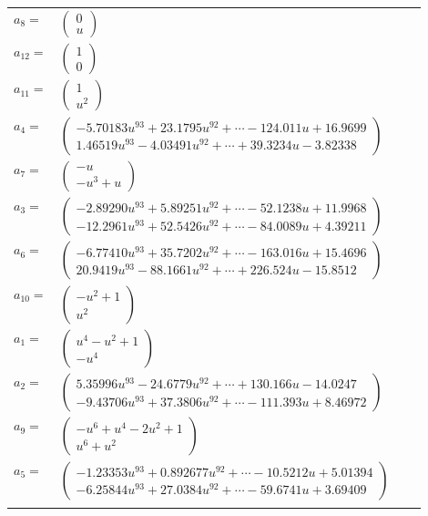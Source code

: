 \documentclass[1p]{elsarticle_modified}
\theoremstyle{definition}
\begin{document}
\begin{tabular}{m{7pt} m{180pt} m{7pt} m{180pt} }
\flushright $a_{8}=$&$\begin{pmatrix}0\\u\end{pmatrix}$ \\
\flushright $a_{12}=$&$\begin{pmatrix}1\\0\end{pmatrix}$ \\
\flushright $a_{11}=$&$\begin{pmatrix}1\\u^2\end{pmatrix}$ \\
\flushright $a_{4}=$&$\begin{pmatrix}-5.70183 u^{93}+23.1795 u^{92}+\cdots-124.011 u+16.9699\\1.46519 u^{93}-4.03491 u^{92}+\cdots+39.3234 u-3.82338\end{pmatrix}$ \\
\flushright $a_{7}=$&$\begin{pmatrix}- u\\- u^3+u\end{pmatrix}$ \\
\flushright $a_{3}=$&$\begin{pmatrix}-2.89290 u^{93}+5.89251 u^{92}+\cdots-52.1238 u+11.9968\\-12.2961 u^{93}+52.5426 u^{92}+\cdots-84.0089 u+4.39211\end{pmatrix}$ \\
\flushright $a_{6}=$&$\begin{pmatrix}-6.77410 u^{93}+35.7202 u^{92}+\cdots-163.016 u+15.4696\\20.9419 u^{93}-88.1661 u^{92}+\cdots+226.524 u-15.8512\end{pmatrix}$ \\
\flushright $a_{10}=$&$\begin{pmatrix}- u^2+1\\u^2\end{pmatrix}$ \\
\flushright $a_{1}=$&$\begin{pmatrix}u^4- u^2+1\\- u^4\end{pmatrix}$ \\
\flushright $a_{2}=$&$\begin{pmatrix}5.35996 u^{93}-24.6779 u^{92}+\cdots+130.166 u-14.0247\\-9.43706 u^{93}+37.3806 u^{92}+\cdots-111.393 u+8.46972\end{pmatrix}$ \\
\flushright $a_{9}=$&$\begin{pmatrix}- u^6+u^4-2 u^2+1\\u^6+u^2\end{pmatrix}$ \\
\flushright $a_{5}=$&$\begin{pmatrix}-1.23353 u^{93}+0.892677 u^{92}+\cdots-10.5212 u+5.01394\\-6.25844 u^{93}+27.0384 u^{92}+\cdots-59.6741 u+3.69409\end{pmatrix}$\\&\end{tabular}
\end{document}
